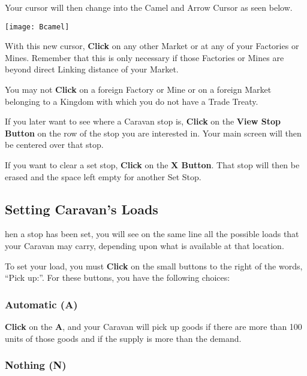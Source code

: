 
Your cursor will then change into the Camel and Arrow Cursor as seen below.

\texttt{[image: Bcamel]}

With this new cursor, \textbf{Click} on any other Market or at any of your Factories or Mines. Remember that this is only necessary if those Factories or Mines are beyond direct Linking distance of your Market.

You may not \textbf{Click} on a foreign Factory or Mine or on a foreign Market belonging to a Kingdom with which you do not have a Trade Treaty.


If you later want to see where a Caravan stop is, \textbf{Click} on the \textbf{View Stop Button} on the row of the stop you are interested in. Your main screen will then be centered over that stop.

If you want to clear a set stop, \textbf{Click} on the \textbf{X Button}. That stop will then be erased and the space left empty for another Set Stop.

\subsection{Setting Caravan’s Loads}


hen a stop has been set, you will see on the same line all the possible loads that your Caravan may carry, depending upon what is available at that location.


To set your load, you must \textbf{Click} on the small buttons to the right of the words, “Pick up:”. For these buttons, you have the following choices:

\subsubsection{Automatic (A)}


\textbf{Click} on the \textbf{A}, and your Caravan will pick up goods if there are more than 100 units of those goods and if the supply is more than the demand.

\subsubsection{Nothing (N)}

